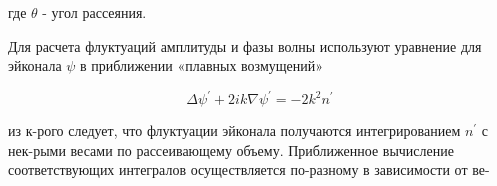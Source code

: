 \documentclass[10pt]{article}
\begin{document}
где $\theta$ - угол рассеяния.



Для расчета флуктуаций амплитуды и фазы волны используют уравнение для эйконала $\psi$ в приближении «плавных возмущений»



\[

\Delta \psi^{\prime}+2 i k \nabla \psi^{\prime}=-2 k^{2} n^{\prime}

\]



из к-рого следует, что флуктуации эйконала получаются интегрированием $n^{\prime}$ с нек-рыми весами по рассеивающему объему. Приближенное вычисление соответствующих интегралов осуществляется по-разному в зависимости от ве-
\end{document}
